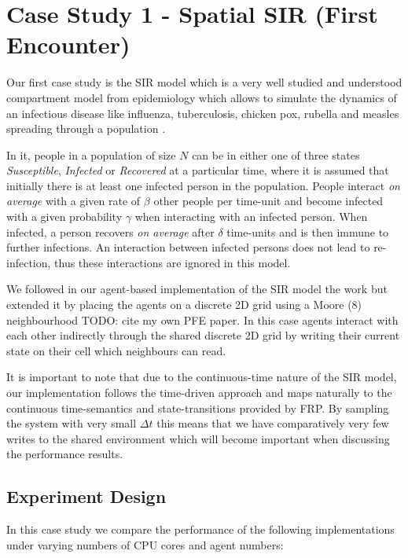 \section{Case Study 1 - Spatial SIR (First Encounter)} 
Our first case study is the SIR model which is a very well studied and understood compartment model from epidemiology \cite{kermack_contribution_1927} which allows to simulate the dynamics of an infectious disease like influenza, tuberculosis, chicken pox, rubella and measles spreading through a population \cite{enns_its_2010}.

In it, people in a population of size $N$ can be in either one of three states \textit{Susceptible}, \textit{Infected} or \textit{Recovered} at a particular time, where it is assumed that initially there is at least one infected person in the population. People interact \textit{on average} with a given rate of $\beta$ other people per time-unit and become infected with a given probability $\gamma$ when interacting with an infected person. When infected, a person recovers \textit{on average} after $\delta$ time-units and is then immune to further infections. An interaction between infected persons does not lead to re-infection, thus these interactions are ignored in this model. 

We followed in our agent-based implementation of the SIR model the work \cite{macal_agent-based_2010} but extended it by placing the agents on a discrete 2D grid using a Moore (8) neighbourhood TODO: cite my own PFE paper. In this case agents interact with each other indirectly through the shared discrete 2D grid by writing their current state on their cell which neighbours can read.

It is important to note that due to the continuous-time nature of the SIR model, our implementation follows the time-driven \cite{meyer_event-driven_2014} approach and maps naturally to the continuous time-semantics and state-transitions provided by FRP. By sampling the system with very small $\Delta t$ this means that we have comparatively very few writes to the shared environment which will become important when discussing the performance results.

\subsection{Experiment Design}
In this case study we compare the performance of the following implementations under varying numbers of CPU cores and agent numbers:

